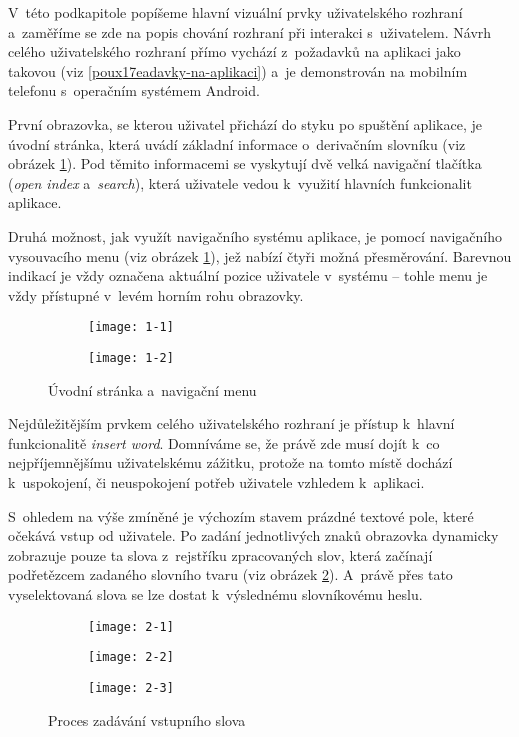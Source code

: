 V~této podkapitole popíšeme hlavní vizuální prvky uživatelského rozhraní
a~zaměříme se zde na popis chování rozhraní při interakci s~uživatelem.
Návrh celého uživatelského rozhraní přímo vychází z~požadavků na
aplikaci jako takovou (viz \ref{poux17eadavky-na-aplikaci}) a~je
demonstrován na mobilním telefonu s~operačním systémem Android.

První obrazovka, se kterou uživatel přichází do styku po spuštění
aplikace, je úvodní stránka, která uvádí základní informace o~derivačním
slovníku (viz obrázek \ref{1}). Pod těmito informacemi se vyskytují dvě
velká navigační tlačítka (\emph{open index} a~\emph{search}), která
uživatele vedou k~využití hlavních funkcionalit aplikace.

Druhá možnost, jak využít navigačního systému aplikace, je pomocí
navigačního vysouvacího menu (viz obrázek \ref{1}), jež nabízí čtyři
možná přesměrování. Barevnou indikací je vždy označena aktuální pozice
uživatele v~systému -- tohle menu je vždy přístupné v~levém horním rohu
obrazovky.

\begin{figure}[hb!]
  \begin{subfigure}[b]{0.45\textwidth}
    \texttt{[image: 1-1]}
  \end{subfigure}
  \hfill
  \begin{subfigure}[b]{0.45\textwidth}
    \texttt{[image: 1-2]}
  \end{subfigure}
  \caption{Úvodní stránka a~navigační menu}
  \label{1}
\end{figure}

Nejdůležitějším prvkem celého uživatelského rozhraní je přístup k~hlavní
funkcionalitě \emph{insert word}. Domníváme se, že právě zde musí dojít
k~co nejpříjemnějšímu uživatelskému zážitku, protože na tomto místě
dochází k~uspokojení, či neuspokojení potřeb uživatele vzhledem
k~aplikaci.

S~ohledem na výše zmíněné je výchozím stavem prázdné textové pole, které
očekává vstup od uživatele. Po zadání jednotlivých znaků obrazovka
dynamicky zobrazuje pouze ta slova z~rejstříku zpracovaných slov, která
začínají podřetězcem zadaného slovního tvaru (viz obrázek \ref{2}).
A~právě přes tato vyselektovaná slova se lze dostat k~výslednému
slovníkovému heslu.

\begin{figure}[ht]
  \begin{subfigure}[b]{0.3\textwidth}
    \texttt{[image: 2-1]}
  \end{subfigure}
  \hfill
  \begin{subfigure}[b]{0.3\textwidth}
    \texttt{[image: 2-2]}
  \end{subfigure}
   \hfill
  \begin{subfigure}[b]{0.3\textwidth}
   \texttt{[image: 2-3]}
  \end{subfigure}
  \caption{Proces zadávání vstupního slova}
  \label{2}
\end{figure}

